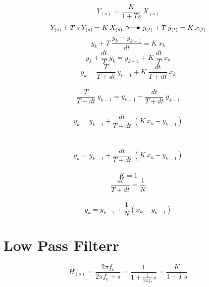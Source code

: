 \documentclass[
    10pt, %
    DIV12,
    english, %
    a5paper, %
    twoside, %
    titlepage, %
    parskip=half, %
    headings=small, %
    listof=totoc, %
    bibliography=totoc, %
    index=totoc, %
    captions=tableheading, %
    final %
]{scrbook}
\begin{document}
\begin{equation}
Y_{(s)} =  \frac{K}{1+T s} \: X_{(s)}\nonumber
\end{equation}
\begin{equation}
Y_{(s)}+ T \: s\: Y_{(s)} = K \:X_{(s)} \:\: \laplace \:\: y_{(t)}+T\:\dot{y}_{(t)}=K\: x_{(t)}\nonumber
\end{equation}
\begin{equation}
y_{k}+T\:\frac{y_k-y_{k-1}}{dt}=K\: x_k\nonumber
\end{equation}
\begin{equation}
y_{k}+\frac{dt}{T}\:y_k=y_{k-1}+K\:\frac{dt}{T}\:x_k\nonumber
\end{equation}
\begin{equation}
y_{k}=\frac{T}{T+dt}\:y_{k-1}+K\:\frac{dt}{T+dt}\:x_k\nonumber
\end{equation}
\\
\begin{equation}
\frac{T}{T+dt}\:y_{k-1}=y_{k-1}-\frac{dt}{T+dt}\:y_{k-1}\nonumber
\end{equation}
\\
\begin{equation}
y_{k}=y_{k-1}+\frac{dt}{T+dt}\:\left(K\:x_k-y_{k-1}\right)\nonumber
\end{equation}
\\
\\
\begin{equation}
y_{k}=y_{k-1}+\frac{dt}{T+dt}\:\left(K\:x_k-y_{k-1}\right)\nonumber
\end{equation}
\\
\begin{equation}
K=1\nonumber
\end{equation}
\begin{equation}
\frac{dt}{T+dt} = \frac{1}{N}\nonumber
\end{equation}
\\
\begin{equation}
y_{k}=y_{k-1}+\frac{1}{N}\left(x_{k}-y_{k-1}\right)\nonumber
\end{equation}


\section{Low Pass Filterr}

\begin{equation}
H_{(s)} = \frac{2\pi f_c}{2\pi f_c+s}=\frac{1}{1+\frac{1}{2\pi f_c}s}= \frac{K}{1+T\:s} \nonumber
\end{equation}
\end{document}
